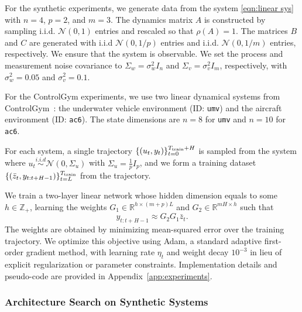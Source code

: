 \documentclass[11pt]{article}
\renewcommand{\cite}{\citep}
\newcommand{\Ncal}{\mathcal{N}}
\newcommand{\R}{\mathbb{R}}				%
\newcommand{\Z}{\mathbb{Z}}
\newcommand{\<}{\langle}
\renewcommand{\>}{\rangle}
\numberwithin{equation}{section}
\begin{document}
For the synthetic experiments, we generate data from the system \eqref{eqn:linear sys} with $n=4$, $p=2$, and $m=3$.
The dynamics matrix $A$ is constructed by sampling i.i.d. $\Ncal(0,1)$ entries and rescaled so that $\rho(A)=1$.
The matrices $B$ and $C$ are generated with i.i.d $\Ncal(0,1/p)$ entries and i.i.d. $\Ncal(0,1/m)$ entries, respectively. 
We ensure that the system is observable.
We set the process and measurement noise covariance to $\Sigma_w = \sigma_w^2 I_n$ and $\Sigma_v = \sigma_v^2I_m$, respectively,
with $\sigma_w^2 = 0.05$ and $\sigma_v^2 = 0.1$.


For the ControlGym experiments, we use two linear dynamical systems from ControlGym~\cite{zhang2024controlgym}: the underwater vehicle environment (ID: \texttt{umv}) and the aircraft environment (ID: \texttt{ac6}). The state dimensions are \(n = 8\) for \texttt{umv} and \(n = 10\) for \texttt{ac6}.



For each system, a single trajectory $\{(u_t,y_t)\}_{t=0}^{T_{\rm train}+H}$ is sampled from the system where $u_t \overset{i.i.d}{\sim} \Ncal(0, \Sigma_u)$ with $\Sigma_u = \frac{1}{p}I_p$, and we form a training dataset $\{(\bar z_t, y_{t:t+H-1})\}_{t=L}^{T_{\rm train}}$ from the trajectory.

We train a two-layer linear network whose hidden dimension equals to some $h\in \Z_+$, learning the weights $G_1 \in \R^{h \times (m+p)L}$ and $G_2 \in \R^{mH \times h}$ such that
\begin{equation}
    y_{t:t+H-1} \approx G_2G_1 \bar z_t.
\end{equation}
The weights are obtained by minimizing mean-squared error over the training trajectory. 
We optimize this objective using Adam, a standard adaptive first-order gradient method, with learning rate $\eta_t$ and weight decay $10^{-3}$ in lieu of explicit regularization or parameter constraints. Implementation details and pseudo-code are provided in Appendix~\ref{app:experiments}.


\subsubsection{Architecture Search on Synthetic Systems} \label{subsubsec:architecture-search}
\end{document}
